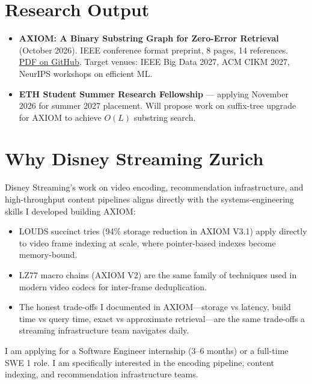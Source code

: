 \documentclass[11pt,a4paper]{article}
\begin{document}
\section*{Research Output}

\begin{itemize}
\item \textbf{AXIOM: A Binary Substring Graph for Zero-Error Retrieval} (October 2026). IEEE conference format preprint, 8 pages, 14 references. \href{https://github.com/Yashas-K-Gangatkar/axiom-3d/blob/main/paper/main.pdf}{PDF on GitHub}. Target venues: IEEE Big Data 2027, ACM CIKM 2027, NeurIPS workshops on efficient ML.

\item \textbf{ETH Student Summer Research Fellowship} --- applying November 2026 for summer 2027 placement. Will propose work on suffix-tree upgrade for AXIOM to achieve $O(L)$ substring search.
\end{itemize}

\section*{Why Disney Streaming Zurich}

Disney Streaming's work on video encoding, recommendation infrastructure, and high-throughput content pipelines aligns directly with the systems-engineering skills I developed building AXIOM:

\begin{itemize}
\item LOUDS succinct tries (94\% storage reduction in AXIOM V3.1) apply directly to video frame indexing at scale, where pointer-based indexes become memory-bound.
\item LZ77 macro chains (AXIOM V2) are the same family of techniques used in modern video codecs for inter-frame deduplication.
\item The honest trade-offs I documented in AXIOM---storage vs latency, build time vs query time, exact vs approximate retrieval---are the same trade-offs a streaming infrastructure team navigates daily.
\end{itemize}

I am applying for a Software Engineer internship (3--6 months) or a full-time SWE 1 role. I am specifically interested in the encoding pipeline, content indexing, and recommendation infrastructure teams.
\end{document}
